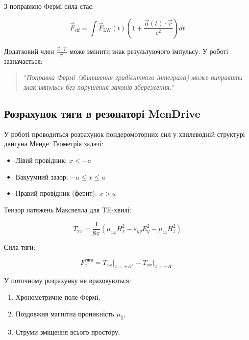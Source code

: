 \documentclass[12pt, a4paper]{article}
\begin{document}
З поправкою Фермі сила стає:

\begin{equation}
\vec{F}_{\text{eff}} = \int \vec{F}_{\text{LW}}(t) \left( 1 + \frac{\vec{a}(t) \cdot \vec{r}}{c^2} \right) dt
\label{eq:fermi_force}
\end{equation}

Додатковий член $\frac{\vec{a} \cdot \vec{r}}{c^2}$ може змінити знак результуючого імпульсу. У роботі \cite{PlasmaExplosion} зазначається:

\begin{quote}
``\textit{Поправка Фермі (збільшення градієнтного інтеграла) може виправити знак імпульсу без порушення законів збереження.}''
\end{quote}

\subsection{Розрахунок тяги в резонаторі MenDrive}

У роботі \cite{MenDrive} проводиться розрахунок пондеромоторних сил у хвилеводній структурі двигуна Менде. Геометрія задачі:

\begin{itemize}
    \item Лівий провідник: $x < -a$
    \item Вакуумний зазор: $-a \le x \le a$
    \item Правий провідник (ферит): $x > a$
\end{itemize}

Тензор натяжень Максвелла для TE-хвилі:

\begin{equation}
T_{xx} = \frac{1}{8\pi} \left( \mu_{xx} H_x^2 - \varepsilon_{yy} E_y^2 - \mu_{zz} H_z^2 \right)
\label{eq:stress_tensor}
\end{equation}

Сила тяги:

\begin{equation}
F_x^{\text{тяга}} = T_{xx}\big|_{x=+A^+} - T_{xx}\big|_{x=-A^-}
\label{eq:thrust_force}
\end{equation}

У поточному розрахунку \cite{MenDrive} не враховуються:
\begin{enumerate}
    \item Хронометричне поле Фермі,
    \item Поздовжня магнітна проникність $\mu_{\parallel}$,
    \item Струми зміщення всього простору.
\end{enumerate}
\end{document}
